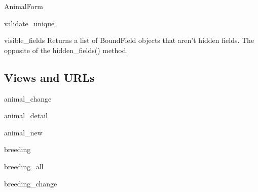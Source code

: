 \documentclass[letterpaper,10pt,english]{sphinxmanual}
\begin{document}
\begin{classdesc}{AnimalForm}
\hypertarget{animal.forms.AnimalForm.validate_unique}{}\begin{methoddesc}[AnimalForm]{validate\_unique}{}\end{methoddesc}

\hypertarget{animal.forms.AnimalForm.visible_fields}{}\begin{methoddesc}[AnimalForm]{visible\_fields}{}
Returns a list of BoundField objects that aren't hidden fields.
The opposite of the hidden\_fields() method.
\end{methoddesc}
\end{classdesc}


\subsection{Views and URLs}
\hypertarget{module-animal.views}{}
\modulesynopsis{}

\hypertarget{animal.views.animal_change}{}\begin{memberdesc}{animal\_change}\end{memberdesc}

\hypertarget{animal.views.animal_detail}{}\begin{memberdesc}{animal\_detail}\end{memberdesc}

\hypertarget{animal.views.animal_new}{}\begin{memberdesc}{animal\_new}\end{memberdesc}

\hypertarget{animal.views.breeding}{}\begin{memberdesc}{breeding}\end{memberdesc}

\hypertarget{animal.views.breeding_all}{}\begin{memberdesc}{breeding\_all}\end{memberdesc}

\hypertarget{animal.views.breeding_change}{}\begin{memberdesc}{breeding\_change}\end{memberdesc}
\end{document}
